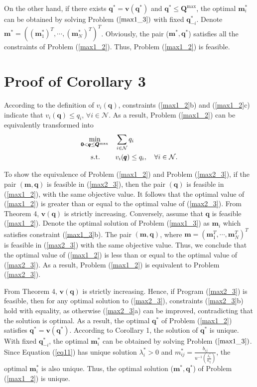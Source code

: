 \documentclass[journal]{IEEEtran}
\begin{document}
On the other hand, if there exists $\pmb q^*=\pmb v(\pmb q^*)$ and $\pmb q^* \leq \pmb Q^{\max}$,
the optimal $\pmb m_i^*$ can be obtained by solving Problem $(\ref{max1_3})$ with fixed $\pmb q_{-i}^*$.
Denote $\pmb m^*=((\pmb m^*_1)^T, \cdots, (\pmb m^*_N)^T)^T$.
Obviously, the pair ($\pmb m^*, \pmb q^*$) satisfies all the constraints of Problem (\ref{max1_2}).
Thus, Problem (\ref{max1_2}) is feasible.

\section{Proof of Corollary 3}
According to the definition of $ v_i (\pmb q)$, constraints (\ref{max1_2}b) and  (\ref{max1_2}c) indicate that $v_i (\pmb q) \leq q_i$, $\forall i \in \mathcal N$.
As a result, Problem  (\ref{max1_2}) can be equivalently transformed into
\begin{subequations}\label{max2_3}
\begin{align}
\mathop{\min}_{\pmb{0} < \pmb{q} \leq \pmb{Q}^{\max}}\quad
&\sum_{i \in {\cal{N}}} q_i
\\
\textrm{s.t.}\qquad\:
& v_i (\pmb q) \leq q_i, \quad\forall i \in \mathcal N.
\end{align}
\end{subequations}

To show the equivalence of Problem (\ref{max1_2}) and Problem (\ref{max2_3}), if the pair $(\pmb{m},\pmb{q})$ is feasible in (\ref{max2_3}), then the pair
$(\pmb{q})$ is feasible in (\ref{max1_2}),
with the same objective value.
It follows that the optimal value of (\ref{max1_2}) is greater than or equal to the optimal value of (\ref{max2_3}).
From Theorem 4,
$\pmb{v}(\pmb{q})$ is strictly increasing.
Conversely, assume that $\pmb{q}$ is feasible (\ref{max1_2}).
Denote the optimal solution of Problem (\ref{max1_3}) as $\pmb m_i$ which satisfies constraint (\ref{max1_3}b).
The pair $(\pmb{m},\pmb{q})$, where $\pmb m=(\pmb m_1^T, \cdots, \pmb m_N^T)^T$ is feasible in (\ref{max2_3}) with the same objective value.
Thus, we conclude that the optimal value of (\ref{max1_2}) is less than or equal to the optimal value of (\ref{max2_3}).
As a result, Problem (\ref{max1_2}) is equivalent to Problem (\ref{max2_3}).

From Theorem 4,
$\pmb{v}(\pmb{q})$ is strictly increasing.
Hence, if Program (\ref{max2_3}) is feasible, then for any optimal solution to (\ref{max2_3}),
constraints (\ref{max2_3}b) hold with equality, as otherwise (\ref{max2_3}a) can be improved,
contradicting that the solution is optimal.
As a result, the optimal $\pmb q^*$ of Problem (\ref{max1_2}) satisfies  $\pmb q^*=\pmb v(\pmb q^*)$.
According to Corollary 1, the solution of $\pmb q^*$ is unique.
With fixed $\pmb q_{-i}^*$, the optimal $\pmb m_i^*$ can be obtained by solving Problem $(\ref{max1_3})$.
Since Equation (\ref{eq11}) has unique solution $\lambda_i^*>0$ and $m_{ij}^*=\frac{b_{ij}} { u^{-1} \left(\frac { \lambda_i^*} {a_{ij}} \right)}$, the optimal $\pmb m_i^*$ is also unique.
Thus, the optimal solution ($\pmb m^*, \pmb q^*$) of Problem (\ref{max1_2}) is unique.
\end{document}
